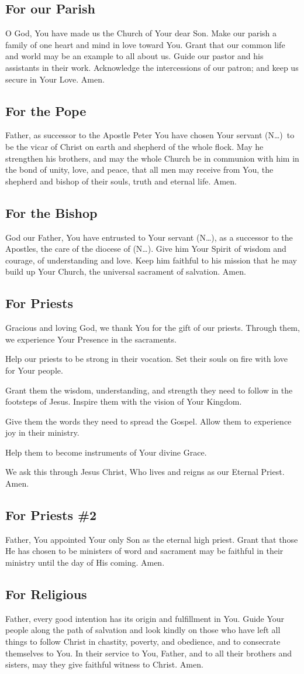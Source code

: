 \documentclass[12pt]{article}
\newcommand{\prayertitle}[1]{\subsection{#1}}
\newcommand{\insertname}{(N\dots)\xspace}
\begin{document}
\prayertitle{For our Parish}
O God, You have made us the Church of Your dear Son.
Make our parish a family of one heart and mind in love toward You.
Grant that our common life and world may be an example to all about us.
Guide our pastor and his assistants in their work.
Acknowledge the intercessions of our patron; and keep us secure in Your Love.
Amen.

\prayertitle{For the Pope}
Father, as successor to the Apostle Peter You have chosen Your servant \insertname\ to be the vicar of Christ on earth and shepherd of the whole flock.
May he strengthen his brothers, and may the whole Church be in communion with him in the bond of unity, love, and peace, that all men may receive from You, the shepherd and bishop of their souls, truth and eternal life.
Amen.
\newpage
\prayertitle{For the Bishop}
God our Father, You have entrusted to Your servant \insertname, as a successor to the Apostles, the care of the diocese of \insertname.
Give him Your Spirit of wisdom and courage, of understanding and love.
Keep him faithful to his mission that he may build up Your Church, the universal sacrament of salvation.
Amen.

\prayertitle{For Priests}
Gracious and loving God, we thank You for the gift of our priests.
Through them, we experience Your Presence in the sacraments.

Help our priests to be strong in their vocation.
Set their souls on fire with love for Your people.

Grant them the wisdom, understanding, and strength they need to follow in the footsteps of Jesus.
Inspire them with the vision of Your Kingdom.

Give them the words they need to spread the Gospel.
Allow them to experience joy in their ministry.

Help them to become instruments of Your divine Grace.

We ask this through Jesus Christ, Who lives and reigns as our Eternal Priest.
Amen.

\prayertitle{For Priests \#2}
Father, You appointed Your only Son as the eternal high priest.
Grant that those He has chosen to be ministers of word and sacrament may be faithful in their ministry until the day of His coming.
Amen.

\prayertitle{For Religious}
Father, every good intention has its origin and fulfillment in You.
Guide Your people along the path of salvation and look kindly on those who have left all things to follow Christ in chastity, poverty, and obedience, and to consecrate themselves to You.
In their service to You, Father, and to all their brothers and sisters, may they give faithful witness to Christ.
Amen.
\end{document}
